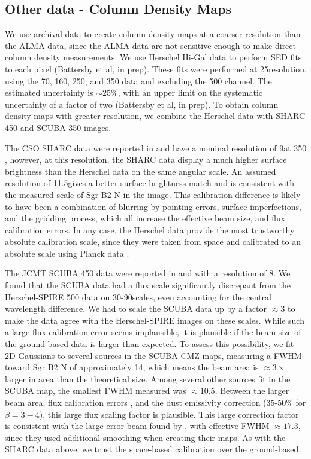 \documentclass[twocolumn]{aastex61}
\newcommand{\percent}{\%\xspace}
\begin{document}
\subsection{Other data - Column Density Maps}
\label{sec:colmaps}
We use archival data to create column density maps at a coarser
resolution than the ALMA data, since the ALMA data are not sensitive
enough to make direct column density measurements.   We use Herschel Hi-Gal
data \citep{Molinari2010a} to perform SED fits to each pixel (Battersby et al,
in prep).  These fits were performed at 25\arcsec resolution, using the 70, 160,
250, and 350 \um data and excluding the 500 \um channel.  The estimated 
uncertainty is $\sim25\%$, with an upper limit on the systematic uncertainty
of a factor of two (Battersby et al, in prep).  To obtain column density maps
with greater resolution, we combine the Herschel data with SHARC 450 \um and
SCUBA 350 \um images.


The CSO SHARC data were reported in \citet{Bally2010a} and have a nominal
resolution of 9\arcsec at 350 \um, however, at this resolution,
the SHARC data display a much higher surface brightness than the Herschel
data on the same angular scale.  An assumed resolution of 11.5\arcsec gives a
better surface brightness match and is consistent with the measured scale of
Sgr B2 N in the image.  This calibration difference is likely to have been a
combination of blurring by pointing errors, surface imperfections, and the
gridding process, which all increase the effective beam size, and flux
calibration errors.  In any case, the Herschel data
provide the most trustworthy absolute calibration scale, since they were taken
from space and calibrated to an absolute scale using Planck data
\citep{Bendo2013a,Bertincourt2016a}.

The JCMT SCUBA 450 \um data were reported in \citet{Pierce-Price2000a} and
\citet{di-Francesco2008a} with a resolution of 8\arcsec.  We found that the
SCUBA data had a flux scale significantly discrepant from the Herschel-SPIRE
500 \um data on 30-90\arcsec scales, even accounting for the central wavelength
difference.  We had to
scale the SCUBA data up by a factor $\approx3$ to make the data agree with
the Herschel-SPIRE images on these scales.  While such a large flux calibration
error seems implausible, it is plausible if the beam size of the ground-based data
is larger than expected.  To assess this possibility, we fit 2D Gaussians to
several sources in the SCUBA CMZ maps, measuring a FWHM toward Sgr B2 N of
approximately 14\arcsec, which means the beam area is $\approx3\times$ larger
in area than the theoretical size.  Among several other sources fit in the
SCUBA map,  the smallest FWHM measured was $\approx10.5$\arcsec.  Between the
larger beam area, flux
calibration errors \citep[quoted at 20\percent in][]{Pierce-Price2000a}, and
the dust emissivity correction (35-50\percent for $\beta=3-4$), this large flux
scaling factor is plausible. This large correction factor is consistent with
the large error beam found by \citet{di-Francesco2008a}, with effective FWHM
$\approx17.3$\arcsec, since they used additional smoothing when creating their
maps.  As with the SHARC data above, we trust the space-based calibration
over the ground-based.
\end{document}
